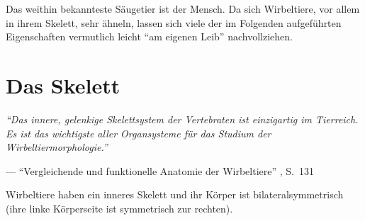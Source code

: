 Das weithin bekannteste Säugetier ist der Mensch. Da sich Wirbeltiere, vor allem in ihrem Skelett, sehr ähneln, lassen sich viele der im Folgenden aufgeführten Eigenschaften vermutlich leicht "`am eigenen Leib"' nachvollziehen.


\section{Das Skelett}
\label{biology_skeleton}

\vspace{0.5cm}
\begin{center}
 \begin{minipage}{12cm}
  \emph{"`Das innere, gelenkige Skelettsystem der Vertebraten ist einzigartig im Tierreich. Es ist das wichtigste aller Organsysteme für das Studium der Wirbeltiermorphologie."'}
 
  --- "`Vergleichende und funktionelle Anatomie der Wirbeltiere"' \cite{Vergleichende_Anatomie}, S.\ 131
 \end{minipage}
\end{center}

Wirbeltiere haben ein inneres Skelett und ihr Körper ist bilateralsymmetrisch (ihre linke Körperseite ist symmetrisch zur rechten).




